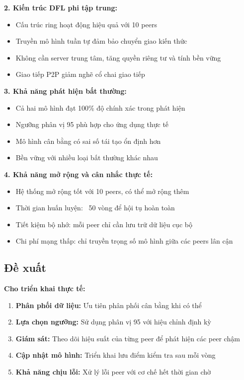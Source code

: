 \textbf{2. Kiến trúc DFL phi tập trung:}
\begin{itemize}
    \item Cấu trúc ring hoạt động hiệu quả với 10 peers
    \item Truyền mô hình tuần tự đảm bảo chuyển giao kiến thức
    \item Không cần server trung tâm, tăng quyền riêng tư và tính bền vững
    \item Giao tiếp P2P giảm nghẽ cổ chai giao tiếp
\end{itemize}

\textbf{3. Khả năng phát hiện bất thường:}
\begin{itemize}
    \item Cả hai mô hình đạt 100\% độ chính xác trong phát hiện
    \item Ngưỡng phân vị 95 phù hợp cho ứng dụng thực tế
    \item Mô hình cân bằng có sai số tái tạo ổn định hơn
    \item Bền vững với nhiều loại bất thường khác nhau
\end{itemize}

\textbf{4. Khả năng mở rộng và cân nhắc thực tế:}
\begin{itemize}
    \item Hệ thống mở rộng tốt với 10 peers, có thể mở rộng thêm
    \item Thời gian huấn luyện: ~50 vòng để hội tụ hoàn toàn
    \item Tiết kiệm bộ nhớ: mỗi peer chỉ cần lưu trữ dữ liệu cục bộ
    \item Chi phí mạng thấp: chỉ truyền trọng số mô hình giữa các peers lân cận
\end{itemize}

\subsection{Đề xuất}

\textbf{Cho triển khai thực tế:}
\begin{enumerate}
    \item \textbf{Phân phối dữ liệu:} Ưu tiên phân phối cân bằng khi có thể
    \item \textbf{Lựa chọn ngưỡng:} Sử dụng phân vị 95 với hiệu chỉnh định kỳ
    \item \textbf{Giám sát:} Theo dõi hiệu suất của từng peer để phát hiện các peer chậm
    \item \textbf{Cập nhật mô hình:} Triển khai lưu điểm kiểm tra sau mỗi vòng
    \item \textbf{Khả năng chịu lỗi:} Xử lý lỗi peer với cơ chế hết thời gian chờ
\end{enumerate}

